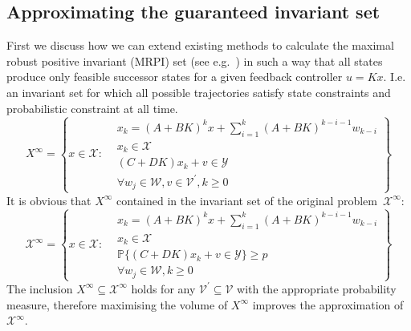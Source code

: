 \documentclass{ifacconf}
\providecommand{\W}{\mathcal W}
\providecommand{\V}{\mathcal V}
\providecommand{\X}{\mathcal X}
\providecommand{\Y}{\mathcal Y}
\providecommand{\PP}{\mathbb P}
\begin{document}
\subsection{Approximating the guaranteed invariant set}\label{ssec:approximating:MRPI}
%
First we discuss how we can extend existing methods to calculate the maximal robust positive invariant (MRPI) set (see e.g.~\cite{blanchini:2007}) in such a way that all states produce only feasible successor states for a given feedback controller $u = Kx$.
%
I.e. an invariant set for which all possible trajectories satisfy state constraints and probabilistic constraint at all time.
%
\begin{equation}\label{eq:alternative:MRPI:set}
	X^\infty = \left\{x\in\X: \begin{aligned}&x_k = (A+BK)^k x + \sum_{i=1}^{k} (A+BK)^{k-i-1} w_{k-i}\\
	&x_k\in\X\\
	&(C+DK)x_k+v\in\Y\\
	&\forall w_j\in\W,v\in \V^\prime,k\geq 0\end{aligned} \right\}
\end{equation}
%
It is obvious that $X^\infty$ contained in the invariant set of the original problem~$\X^\infty$:
%
\begin{equation}
	\X^\infty = \left\{x\in\X: \begin{aligned}&x_k = (A+BK)^k x + \sum_{i=1}^{k} (A+BK)^{k-i-1} w_{k-i}\\
	&x_k\in\X\\
	&\PP\{(C+DK)x_k+v\in\Y\}\geq p\\
	&\forall w_j\in\W,k\geq 0\end{aligned} \right\}
\end{equation}
%
The inclusion $X^\infty\subseteq\X^\infty$ holds for any $\V^\prime\subseteq\V$ with the appropriate probability measure, therefore maximising the volume of $X^\infty$ improves the approximation of $\X^\infty$.
\end{document}

